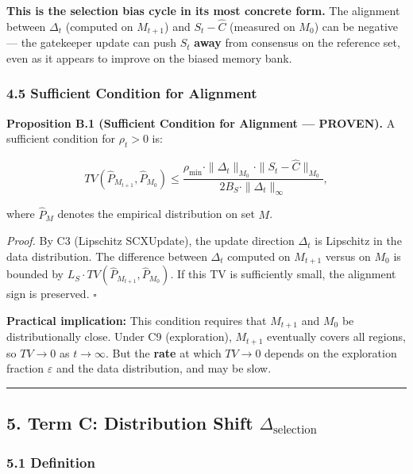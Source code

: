 \documentclass[
  12pt,
]{article}
\begin{document}
\textbf{This is the selection bias cycle in its most concrete form.} The
alignment between \(\Delta_t\) (computed on \(M_{t+1}\)) and
\(S_t - \hat{C}\) (measured on \(M_0\)) can be negative --- the
gatekeeper update can push \(S_t\) \textbf{away} from consensus on the
reference set, even as it appears to improve on the biased memory bank.

\subsubsection{4.5 Sufficient Condition for
Alignment}\label{sufficient-condition-for-alignment}

\textbf{Proposition B.1 (Sufficient Condition for Alignment ---
PROVEN).} A sufficient condition for \(\rho_t > 0\) is:

\[TV(\hat{P}_{M_{t+1}}, \hat{P}_{M_0}) \leq \frac{\rho_{\min} \cdot \|\Delta_t\|_{M_0} \cdot \|S_t - \hat{C}\|_{M_0}}{2 B_S \cdot \|\Delta_t\|_\infty},\]

where \(\hat{P}_{M}\) denotes the empirical distribution on set \(M\).

\emph{Proof.} By C3 (Lipschitz SCXUpdate), the update direction
\(\Delta_t\) is Lipschitz in the data distribution. The difference
between \(\Delta_t\) computed on \(M_{t+1}\) versus on \(M_0\) is
bounded by \(L_S \cdot TV(\hat{P}_{M_{t+1}}, \hat{P}_{M_0})\). If this
TV is sufficiently small, the alignment sign is preserved. \(\square\)

\textbf{Practical implication:} This condition requires that \(M_{t+1}\)
and \(M_0\) be distributionally close. Under C9 (exploration),
\(M_{t+1}\) eventually covers all regions, so \(TV \to 0\) as
\(t \to \infty\). But the \textbf{rate} at which \(TV \to 0\) depends on
the exploration fraction \(\varepsilon\) and the data distribution, and
may be slow.

\begin{center}\rule{0.5\linewidth}{0.5pt}\end{center}

\subsection{\texorpdfstring{5. Term C: Distribution Shift
\(\Delta_{\text{selection}}\)}{5. Term C: Distribution Shift \textbackslash Delta\_\{\textbackslash text\{selection\}\}}}\label{term-c-distribution-shift-delta_textselection}

\subsubsection{5.1 Definition}\label{definition}
\end{document}
